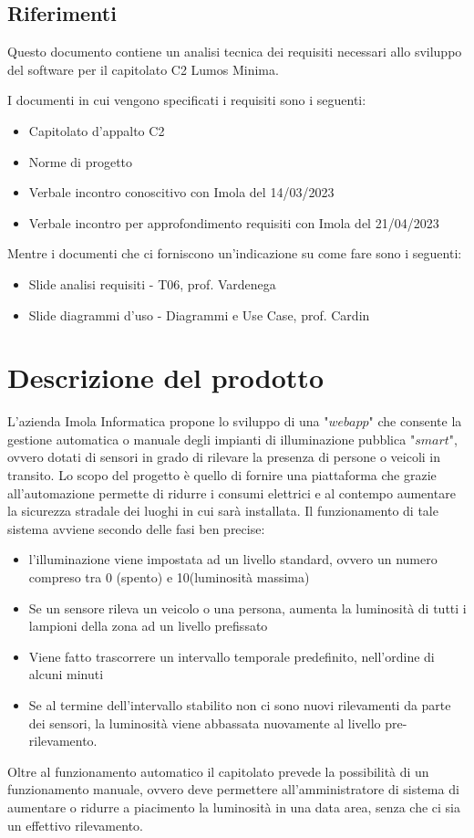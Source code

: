 \documentclass[12pt]{article}
\begin{document}
\subsection{Riferimenti}
Questo documento contiene un analisi tecnica dei requisiti necessari allo sviluppo del software per il capitolato C2 Lumos Minima.

I documenti in cui vengono specificati i requisiti sono i seguenti:
\begin{itemize}
	\item Capitolato d'appalto C2
	\item Norme di progetto
	\item Verbale incontro conoscitivo con Imola del 14/03/2023
	\item Verbale incontro per approfondimento requisiti con Imola del 21/04/2023
\end{itemize}

Mentre i documenti che ci forniscono un'indicazione su come fare sono i seguenti:
\begin{itemize}
	\item Slide analisi requisiti - T06, prof. Vardenega
	\item Slide diagrammi d'uso - Diagrammi e Use Case, prof. Cardin
\end{itemize}

\section{Descrizione del prodotto}
L'azienda Imola Informatica propone lo sviluppo di una "$webapp$" che consente la gestione automatica o manuale degli impianti di illuminazione pubblica "$smart$", ovvero dotati di sensori in grado di rilevare la presenza di persone o veicoli in transito.
Lo scopo del progetto è quello di fornire una piattaforma che grazie all'automazione permette di ridurre i consumi elettrici e al contempo aumentare la sicurezza stradale dei luoghi in cui sarà installata.
Il funzionamento di tale sistema avviene secondo delle fasi ben precise:
\begin{itemize}
	\item l'illuminazione viene impostata ad un livello standard, ovvero un numero compreso tra 0 (spento) e 10(luminosità massima)
	\item Se un sensore rileva un veicolo o una persona, aumenta la luminosità di tutti i lampioni della zona ad un livello prefissato
	\item Viene fatto trascorrere un intervallo temporale predefinito, nell'ordine di alcuni minuti
	\item Se al termine dell'intervallo stabilito non ci sono nuovi rilevamenti da parte dei sensori, la luminosità viene abbassata nuovamente al livello pre-rilevamento.
\end{itemize}
Oltre al funzionamento automatico il capitolato prevede la possibilità di un funzionamento manuale, ovvero deve permettere all'amministratore di sistema di aumentare o ridurre a piacimento la luminosità in una data area, senza che ci sia un effettivo rilevamento.
\end{document}
